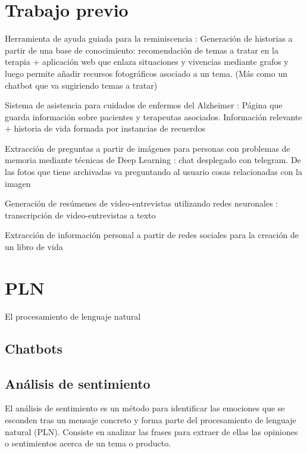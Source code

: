 \section{Trabajo previo}
Herramienta de ayuda guiada para la reminiscencia \citep{reminiscencia} : Generación de historias a partir de una base de conocimiento: recomendación de temas a tratar en la terapia + aplicación web que enlaza situaciones y vivencias mediante grafos y luego permite añadir recursos fotográficos asociado a un tema. (Más como un chatbot que va sugiriendo temas a tratar)

Sistema de asistencia para cuidados de enfermos del Alzheimer \citep{asistencia} : Página que guarda información sobre pacientes y terapeutas asociados. Información relevante + historia de vida formada por instancias de recuerdos

Extracción de preguntas a partir de imágenes para personas con problemas de memoria mediante técnicas de Deep Learning \citep{preguntas} : chat desplegado con telegram. De las fotos que tiene archivadas va preguntando al usuario cosas relacionadas con la imagen

Generación de resúmenes de video-entrevistas utilizando redes neuronales \citep{resumen} : transcripción de video-entrevistas a texto

Extracción de información personal a partir de redes sociales para la creación de un libro de vida \citep{rrss}

\section{PLN}
El procesamiento de lenguaje natural

\subsection{Chatbots}

\subsection{Análisis de sentimiento}

El análisis de sentimiento es un método para identificar las emociones que se esconden tras un mensaje concreto y forma parte del procesamiento de lenguaje natural (PLN). Consiste en analizar las frases para extraer de ellas las opiniones o sentimientos acerca de un tema o producto.


